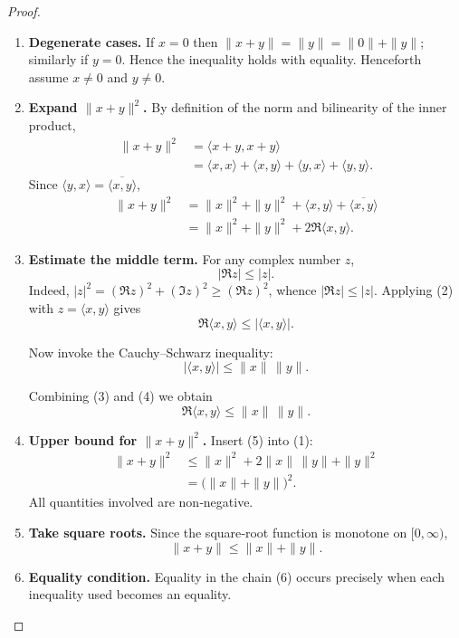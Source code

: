 \begin{proof}
\begin{enumerate}
\item \textbf{Degenerate cases.}  
If \(x=0\) then \(\|x+y\|=\|y\|=\|0\|+\|y\|\); similarly if \(y=0\). Hence the inequality holds with equality.  
Henceforth assume \(x\neq0\) and \(y\neq0\).

\item \textbf{Expand \(\|x+y\|^{2}\).}  
By definition of the norm and bilinearity of the inner product,
\begin{align*}
\|x+y\|^{2}
   &=\langle x+y,x+y\rangle                                      \\
   &=\langle x,x\rangle+\langle x,y\rangle
     +\langle y,x\rangle+\langle y,y\rangle .
\end{align*}
Since \(\langle y,x\rangle=\overline{\langle x,y\rangle}\),
\begin{align}
\|x+y\|^{2}
   &=\|x\|^{2}+ \|y\|^{2}
     +\langle x,y\rangle+\overline{\langle x,y\rangle} \nonumber\\
   &=\|x\|^{2}+ \|y\|^{2}+2\Re\langle x,y\rangle .
\tag{1}
\end{align}

\item \textbf{Estimate the middle term.}  
For any complex number \(z\),
\[
|\Re z|\le |z| .
\tag{2}
\]
Indeed, \(|z|^{2}=(\Re z)^{2}+(\Im z)^{2}\ge (\Re z)^{2}\), whence \(|\Re z|\le|z|\).  
Applying (2) with \(z=\langle x,y\rangle\) gives
\[
\Re\langle x,y\rangle\le |\langle x,y\rangle| .
\tag{3}
\]

Now invoke the Cauchy–Schwarz inequality:
\[
|\langle x,y\rangle|\le \|x\|\,\|y\| .
\tag{4}
\]

Combining (3) and (4) we obtain
\[
\Re\langle x,y\rangle\le \|x\|\,\|y\| .
\tag{5}
\]

\item \textbf{Upper bound for \(\|x+y\|^{2}\).}  
Insert (5) into (1):
\begin{align}
\|x+y\|^{2}
   &\le \|x\|^{2}+2\|x\|\,\|y\|+\|y\|^{2} \nonumber\\
   &=\bigl(\|x\|+\|y\|\bigr)^{2}.
\tag{6}
\end{align}
All quantities involved are non‑negative.

\item \textbf{Take square roots.}  
Since the square‑root function is monotone on \([0,\infty)\),
\[
\|x+y\|\le \|x\|+\|y\|.
\]

\item \textbf{Equality condition.}  
Equality in the chain (6) occurs precisely when each inequality used becomes an equality.


\end{enumerate}
\end{proof}
